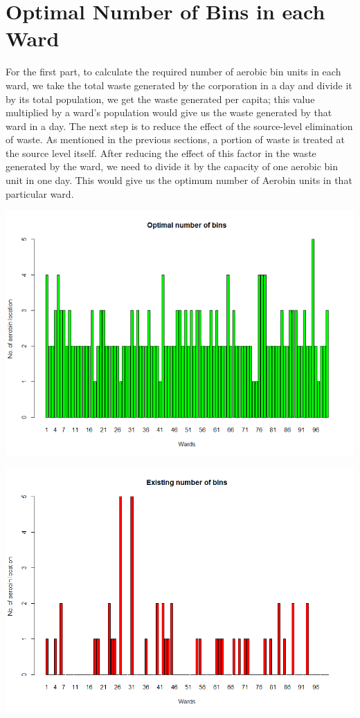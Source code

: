\documentclass[12pt,a4paper]{  report}
\begin{document}
\section{Optimal Number of Bins in each Ward}
\begin{justify}
	For the first part, to calculate the required number of aerobic bin units in each ward, we take the total waste generated by the corporation in a day and divide it by its total population, we get the waste generated per capita; this value multiplied by a ward’s population would give us the waste generated by that ward in a day. The next step is to reduce the effect of the source-level elimination of waste. As mentioned in the previous sections, a portion of waste is treated at the source level itself. After reducing the effect of this factor in the waste generated by the ward, we need to divide it by the capacity of one aerobic bin unit in one day. This would give us the optimum number of Aerobin units in that particular ward.
	
	\includegraphics[width=1\textwidth]{opt}
	
	\includegraphics[width=1\textwidth]{exis}
	


\end{justify}
\end{document}
